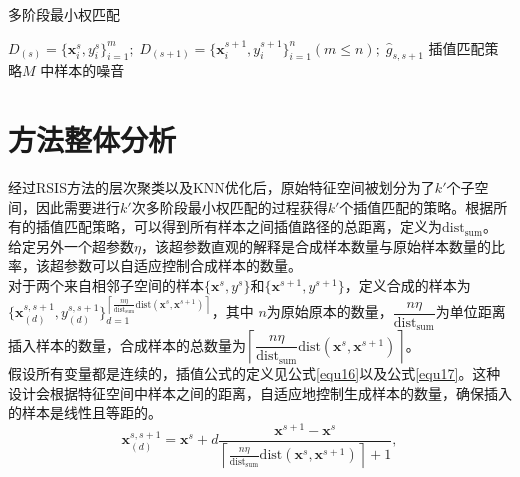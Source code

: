 \documentclass{NauThesis}
\begin{document}
\begin{algorithm}[!h]
    \caption{多阶段最小权匹配}
    \label{a2}
    \renewcommand{\algorithmicrequire}{\textbf{Input:}}
    \renewcommand{\algorithmicensure}{\textbf{Output:}}
    \begin{algorithmic}[1]
        \REQUIRE $D_{(s)}=\{\boldsymbol{x}_i^{s},y_i^s\}_{i=1}^m;\;D_{(s+1)}=\{\boldsymbol{x}_i^{s+1},y_i^{s+1}\}_{i=1}^n(m\le{n});\;\hat{g}_{s,s+1}$  %
        \ENSURE 插值匹配策略$M$    %
        中样本的噪音
        \ENDFOR
    \end{algorithmic}
\end{algorithm}

\section{方法整体分析}
经过RSIS方法的层次聚类以及KNN优化后，原始特征空间被划分为了$k'$个子空间，因此需要进行$k'$次多阶段最小权匹配的过程获得$k'$个插值匹配的策略。根据所有的插值匹配策略，可以得到所有样本之间插值路径的总距离，定义为$\text{dist}_{\text{sum}}$。
给定另外一个超参数$\eta$，该超参数直观的解释是合成样本数量与原始样本数量的比率，该超参数可以自适应控制合成样本的数量。\\
\hspace*{2em}对于两个来自相邻子空间的样本$\{\boldsymbol{x}^s,y^s\}$和$\{\boldsymbol{x}^{s+1},y^{s+1}\}$，定义合成的样本为$\{\boldsymbol{x}_{(d)}^{s,s+1},y_{(d)}^{s,s+1} \}_{d=1}^{\left\lceil \frac{n\eta }{\text{dist}_{\text{sum}}}\text{dist}(\boldsymbol{x}^s,\boldsymbol{x}^{s+1})\right\rceil}$，其中
$n$为原始原本的数量，$\dfrac{n\eta}{\text{dist}_{\text{sum}}}$为单位距离插入样本的数量，合成样本的总数量为$\left\lceil \dfrac{n\eta}{\text{dist}_{\text{sum}}}\text{dist}(\boldsymbol{x}^s,\boldsymbol{x}^{s+1})\right\rceil$。
\\\hspace*{2em}假设所有变量都是连续的，插值公式的定义见公式\eqref{equ16}以及公式\eqref{equ17}。这种设计会根据特征空间中样本之间的距离，自适应地控制生成样本的数量，确保插入的样本是线性且等距的。
\begin{equation}\label{equ16}
    \boldsymbol{x}^{s,s+1}_{(d)}=\boldsymbol{x}^s+d\dfrac{\boldsymbol{x}^{s+1}-\boldsymbol{x}^{s}}{\left\lceil \frac{n\eta}{\text{dist}_{\text{sum}}}\text{dist}(\boldsymbol{x}^s,\boldsymbol{x}^{s+1})\right\rceil+1},
\end{equation}
\end{document}
